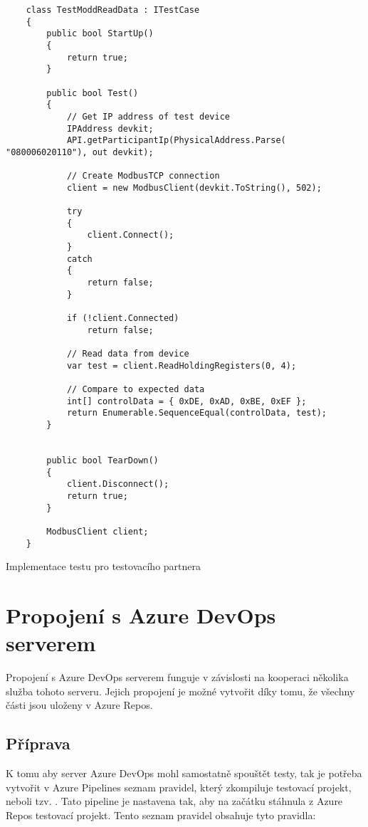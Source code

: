 \begin{listing}[htbp]
    \centering{}
    \begin{verbatim}
    class TestModdReadData : ITestCase
    {
        public bool StartUp()
        {
            return true;
        }

        public bool Test()
        {
            // Get IP address of test device
            IPAddress devkit;
            API.getParticipantIp(PhysicalAddress.Parse( "080006020110"), out devkit);

            // Create ModbusTCP connection
            client = new ModbusClient(devkit.ToString(), 502);

            try 
            {
                client.Connect();
            }
            catch 
            {
                return false;
            }

            if (!client.Connected)
                return false;

            // Read data from device
            var test = client.ReadHoldingRegisters(0, 4);
            
            // Compare to expected data
            int[] controlData = { 0xDE, 0xAD, 0xBE, 0xEF };
            return Enumerable.SequenceEqual(controlData, test);
        }


        public bool TearDown()
        {
            client.Disconnect();
            return true;
        }

        ModbusClient client;
    }
    \end{verbatim}
\caption{Implementace testu pro testovacího partnera}
\label{listing:testcase_partner}
\end{listing}


\section{Propojení s Azure DevOps serverem}
Propojení s Azure DevOps serverem funguje v závislosti na kooperaci několika služba tohoto serveru. Jejich propojení je možné vytvořit díky tomu, že všechny části jsou uloženy v Azure Repos. 

\subsection{Příprava}
K tomu aby server Azure DevOps mohl samostatně spouštět testy, tak je potřeba vytvořit v Azure Pipelines seznam pravidel, který zkompiluje testovací projekt, neboli tzv. . Tato pipeline je nastavena tak, aby na začátku stáhnula z Azure Repos testovací projekt. Tento seznam pravidel obsahuje tyto pravidla:

